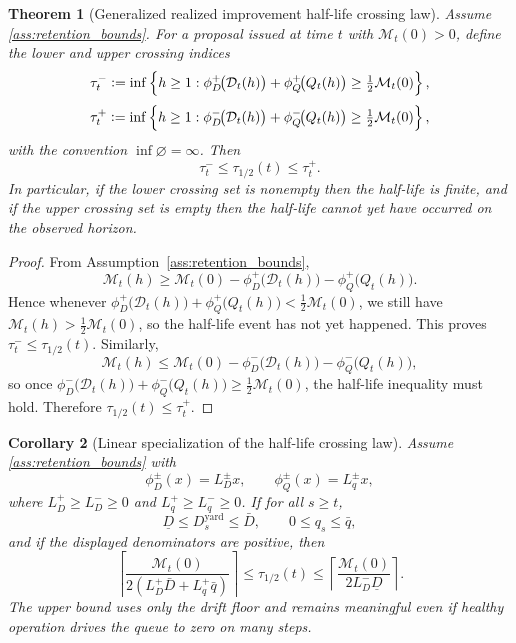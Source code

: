 \documentclass[11pt]{article}
\newtheorem{theorem}{Theorem}[section]
\newtheorem{corollary}[theorem]{Corollary}
\theoremstyle{definition}
\newcommand{\1}{\mathbf{1}}
\newcommand{\Defeq}{\vcentcolon=}
\begin{document}
\begin{theorem}[Generalized realized improvement half-life crossing law]\label{thm:half_life}
Assume \ref{ass:retention_bounds}. For a proposal issued at time $t$ with $\mathcal M_t(0)>0$, define the lower and upper crossing indices
\[
\tau_t^{-}\Defeq \inf\left\{h\ge1: \phi_D^+\!\bigl(\mathcal D_t(h)\bigr)+\phi_Q^+\!\bigl(Q_t(h)\bigr)\ge \tfrac12\mathcal M_t(0)\right\},
\]
\[
\tau_t^{+}\Defeq \inf\left\{h\ge1: \phi_D^-\!\bigl(\mathcal D_t(h)\bigr)+\phi_Q^-\!\bigl(Q_t(h)\bigr)\ge \tfrac12\mathcal M_t(0)\right\},
\]
with the convention $\inf\varnothing=\infty$. Then
\[
\tau_t^{-}\le \tau_{1/2}(t)\le \tau_t^{+}.
\]
In particular, if the lower crossing set is nonempty then the half-life is finite, and if the upper crossing set is empty then the half-life cannot yet have occurred on the observed horizon.
\end{theorem}

\begin{proof}
From Assumption~\ref{ass:retention_bounds},
\[
\mathcal M_t(h)\ge \mathcal M_t(0)-\phi_D^+\!\bigl(\mathcal D_t(h)\bigr)-\phi_Q^+\!\bigl(Q_t(h)\bigr).
\]
Hence whenever $\phi_D^+\!\bigl(\mathcal D_t(h)\bigr)+\phi_Q^+\!\bigl(Q_t(h)\bigr)<\tfrac12\mathcal M_t(0)$, we still have $\mathcal M_t(h)>\tfrac12\mathcal M_t(0)$, so the half-life event has not yet happened. This proves $\tau_t^-\le \tau_{1/2}(t)$. Similarly,
\[
\mathcal M_t(h)\le \mathcal M_t(0)-\phi_D^-\!\bigl(\mathcal D_t(h)\bigr)-\phi_Q^-\!\bigl(Q_t(h)\bigr),
\]
so once $\phi_D^-\!\bigl(\mathcal D_t(h)\bigr)+\phi_Q^-\!\bigl(Q_t(h)\bigr)\ge \tfrac12\mathcal M_t(0)$, the half-life inequality must hold. Therefore $\tau_{1/2}(t)\le \tau_t^+$.
\end{proof}

\begin{corollary}[Linear specialization of the half-life crossing law]\label{cor:half_life_coarse}
Assume \ref{ass:retention_bounds} with
\[
\phi_D^\pm(x)=L_D^\pm x,
\qquad
\phi_Q^\pm(x)=L_q^\pm x,
\]
where $L_D^+\ge L_D^-\ge 0$ and $L_q^+\ge L_q^-\ge 0$. If for all $s\ge t$,
\[
\underline D \le D_s^{\mathrm{yard}}\le \bar D,
\qquad
0\le q_s\le \bar q,
\]
and if the displayed denominators are positive, then
\[
\left\lceil \frac{\mathcal M_t(0)}{2(L_D^+\bar D + L_q^+\bar q)} \right\rceil
\le
\tau_{1/2}(t)
\le
\left\lceil \frac{\mathcal M_t(0)}{2L_D^-\underline D} \right\rceil.
\]
The upper bound uses only the drift floor and remains meaningful even if healthy operation drives the queue to zero on many steps.
\end{corollary}
\end{document}

